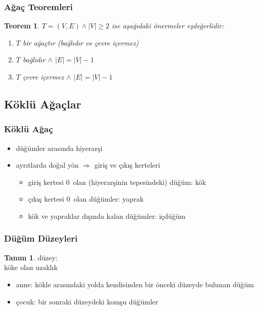\documentclass[dvipsnames]{beamer}
\theoremstyle{definition}
\newtheorem{tanim}[theorem]{Tanım}
\theoremstyle{example}
\theoremstyle{plain}
\newtheorem{teorem}[theorem]{Teorem}
\begin{document}
\begin{frame}[label=theoremset2]
  \frametitle{Ağaç Teoremleri}

  \begin{teorem}
    $T = (V,E) \wedge |V| \geq 2$ ise aşağıdaki önermeler eşdeğerlidir:

    \begin{enumerate}
      \item $T$ bir ağaçtır (bağlıdır ve çevre içermez)
      \item $T$ bağlıdır $\wedge$ $|E| = |V| - 1$
      \item $T$ çevre içermez $\wedge$ $|E| = |V| - 1$
    \end{enumerate}
  \end{teorem}
\end{frame}

\subsection{Köklü Ağaçlar}

\begin{frame}
  \frametitle{Köklü Ağaç}

  \begin{itemize}
    \item düğümler arasında hiyerarşi

    \pause
    \item ayrıtlarda doğal yön $\Rightarrow$ giriş ve çıkış kerteleri
    \begin{itemize}
      \item giriş kertesi 0~olan (hiyerarşinin tepesindeki) düğüm: \alert{kök}
      \item çıkış kertesi 0~olan düğümler: \alert{yaprak}
      \item kök ve yapraklar dışında kalan düğümler: \alert{içdüğüm}
    \end{itemize}
  \end{itemize}
\end{frame}

\begin{frame}
  \frametitle{Düğüm Düzeyleri}

  \begin{tanim}
    \alert{düzey}:\\
    köke olan uzaklık

    \pause
    \begin{itemize}
      \item \alert{anne}: kökle arasındaki yolda kendisinden bir önceki düzeyde
        bulunan düğüm

      \item \alert{çocuk}: bir sonraki düzeydeki komşu düğümler
    \end{itemize}
  \end{tanim}
\end{frame}
\end{document}
